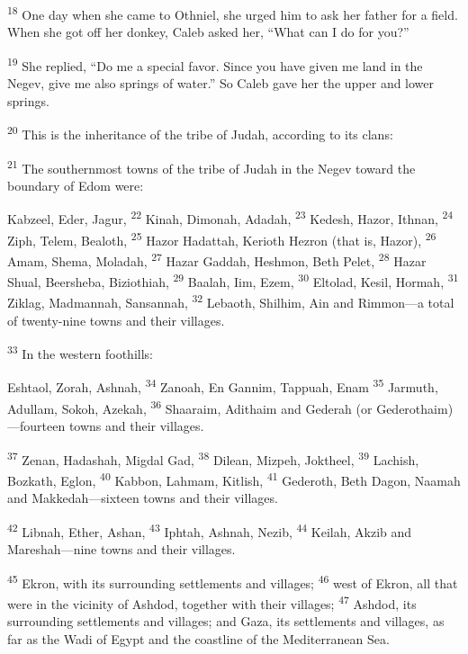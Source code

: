 \documentclass[12pt,twoside]{article}
\newcommand{\vs}[1]{\textsuperscript{#1}}
\begin{document}
\vs{18} One day when she came to Othniel, she urged him to ask her father for a field. When she got off her donkey, Caleb asked her, ``What can I do for you?''

\vs{19} She replied, ``Do me a special favor. Since you have given me land in the Negev, give me also springs of water.'' So Caleb gave her the upper and lower springs.\vspace{0.4cm}

\vs{20} This is the inheritance of the tribe of Judah, according to its clans:\vspace{0.4cm}

\noindent\vs{21} The southernmost towns of the tribe of Judah in the Negev toward the boundary of Edom were:\vspace{0.3cm}

\begin{adjustwidth}{0.5cm}{0cm}
  \hspace{0.5cm}Kabzeel, Eder, Jagur,
  \vs{22} Kinah, Dimonah, Adadah,
  \vs{23} Kedesh, Hazor, Ithnan,
  \vs{24} Ziph, Telem, Bealoth,
  \vs{25} Hazor Hadattah, Kerioth Hezron (that is, Hazor),
  \vs{26} Amam, Shema, Moladah,
  \vs{27} Hazar Gaddah, Heshmon, Beth Pelet,
  \vs{28} Hazar Shual, Beersheba, Biziothiah,
  \vs{29} Baalah, Iim, Ezem,
  \vs{30} Eltolad, Kesil, Hormah,
  \vs{31} Ziklag, Madmannah, Sansannah,
  \vs{32} Lebaoth, Shilhim, Ain and Rimmon---a total of twenty-nine towns and their villages.\vspace{0.3cm}
\end{adjustwidth}

\noindent\vs{33} In the western foothills:\vspace{0.3cm}

\begin{adjustwidth}{0.5cm}{0cm}
  \hspace{0.5cm}Eshtaol, Zorah, Ashnah,
  \vs{34} Zanoah, En Gannim, Tappuah, Enam
  \vs{35} Jarmuth, Adullam, Sokoh, Azekah,
  \vs{36} Shaaraim, Adithaim and Gederah (or Gederothaim)---fourteen towns and their villages.

  \vs{37} Zenan, Hadashah, Migdal Gad,
  \vs{38} Dilean, Mizpeh, Joktheel,
  \vs{39} Lachish, Bozkath, Eglon,
  \vs{40} Kabbon, Lahmam, Kitlish,
  \vs{41} Gederoth, Beth Dagon, Naamah and Makkedah---sixteen towns and their villages.

  \vs{42} Libnah, Ether, Ashan,
  \vs{43} Iphtah, Ashnah, Nezib,
  \vs{44} Keilah, Akzib and Mareshah---nine towns and their villages.

  \vs{45} Ekron, with its surrounding settlements and villages;
  \vs{46} west of Ekron, all that were in the vicinity of Ashdod, together with their villages;
  \vs{47} Ashdod, its surrounding settlements and villages; and Gaza, its settlements and villages, as far as the Wadi of Egypt and the coastline of the Mediterranean Sea.\vspace{0.3cm}
\end{adjustwidth}
\end{document}
